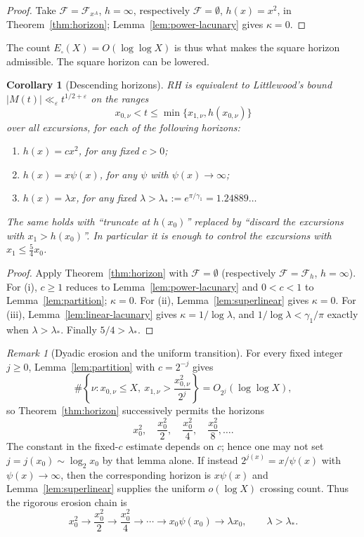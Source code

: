 \documentclass[11pt]{amsart}
\numberwithin{equation}{section}
\theoremstyle{plain}
\newtheorem{corollary}[theorem]{Corollary}
\theoremstyle{definition}
\theoremstyle{remark}
\newtheorem{remark}[theorem]{Remark}
\newcommand{\eps}{\varepsilon}
\newcommand{\F}{\mathcal{F}}
\begin{document}
\begin{proof}
Take $\F=\F_{x^A}$, $h=\infty$, respectively $\F=\emptyset$, $h(x)=x^2$, in
Theorem~\ref{thm:horizon}; Lemma~\ref{lem:power-lacunary} gives
$\kappa=0$.
\end{proof}

The count $E_\square(X)=O(\log\log X)$ is thus what makes the square
horizon admissible. The square horizon can be lowered.

\begin{corollary}[Descending horizons]
\label{cor:descending}
\label{cor:linear-ordinary-RH}
RH is equivalent to Littlewood's bound
$|M(t)|\ll_\eps t^{1/2+\eps}$ on the ranges
\[
x_{0,\nu}<t\le\min\{x_{1,\nu},h(x_{0,\nu})\}
\]
over all excursions, for each of the following horizons:
\begin{enumerate}[label=\textup{(\roman*)}]
\item $h(x)=cx^2$, for any fixed $c>0$;
\item $h(x)=x\psi(x)$, for any $\psi$ with $\psi(x)\to\infty$;
\item $h(x)=\lambda x$, for any fixed $\lambda>\lambda_*:=e^{\pi/\gamma_1}=1.24889\ldots$
\end{enumerate}
The same holds with ``truncate at $h(x_0)$'' replaced by ``discard the
excursions with $x_1>h(x_0)$''. In particular it is enough to control the
excursions with $x_1\le\frac54x_0$.
\end{corollary}

\begin{proof}
Apply Theorem~\ref{thm:horizon} with $\F=\emptyset$ (respectively
$\F=\F_h$, $h=\infty$). For (i), $c\ge1$ reduces to
Lemma~\ref{lem:power-lacunary} and $0<c<1$ to Lemma~\ref{lem:partition};
$\kappa=0$. For (ii), Lemma~\ref{lem:superlinear} gives $\kappa=0$. For
(iii), Lemma~\ref{lem:linear-lacunary} gives $\kappa=1/\log\lambda$, and
$1/\log\lambda<\gamma_1/\pi$ exactly when $\lambda>\lambda_*$. Finally
$5/4>\lambda_*$.
\end{proof}

\begin{remark}[Dyadic erosion and the uniform transition]
\label{rem:dyadic-erosion}
For every fixed integer $j\ge0$, Lemma~\ref{lem:partition} with
$c=2^{-j}$ gives
\[
\#\left\{\nu:x_{0,\nu}\le X,\ x_{1,\nu}>
\frac{x_{0,\nu}^2}{2^j}\right\}=O_{2^j}(\log\log X),
\]
so Theorem~\ref{thm:horizon} successively permits the horizons
\[
x_0^2,\quad \frac{x_0^2}{2},\quad \frac{x_0^2}{4},\quad
\frac{x_0^2}{8},\ldots.
\]
The constant in the fixed-$c$ estimate depends on $c$; hence one may not set
$j=j(x_0)\sim\log_2x_0$ by that lemma alone.  If instead
$2^{j(x)}=x/\psi(x)$ with $\psi(x)\to\infty$, then the corresponding
horizon is $x\psi(x)$ and Lemma~\ref{lem:superlinear} supplies the uniform
$o(\log X)$ crossing count.  Thus the rigorous erosion chain is
\[
x_0^2\to\frac{x_0^2}{2}\to\frac{x_0^2}{4}\to\cdots
\to x_0\psi(x_0)\to\lambda x_0,\qquad\lambda>\lambda_*.
\]
\end{remark}
\end{document}
